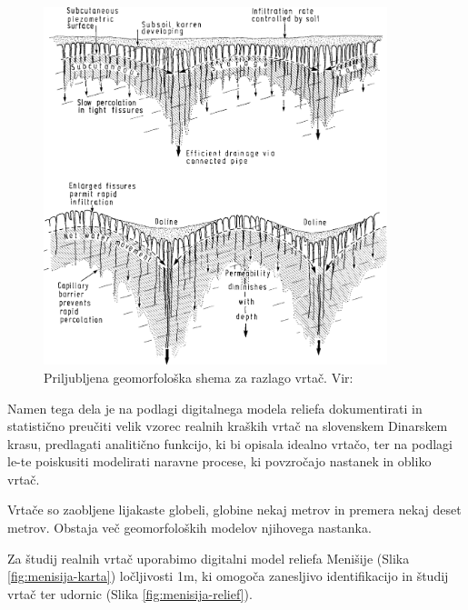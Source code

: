 \documentclass[a4paper, oneside, 12pt]{book}
\begin{document}
  \begin{figure}[H]
    \begin{center}
      \includegraphics[width=10cm]{slike/vrtaca-ford-williams}
    \end{center}
    \caption{Priljubljena geomorfološka shema za razlago vrtač. Vir: \cite{ford2007karst}}
    \label{fig:vrtaca-ford-williams}
  \end{figure}

  Namen tega dela je na podlagi digitalnega modela reliefa dokumentirati in statistično preučiti velik vzorec realnih kraških vrtač na slovenskem Dinarskem krasu, predlagati analitično funkcijo, ki bi opisala idealno vrtačo, ter na podlagi le-te poiskusiti modelirati naravne procese, ki povzročajo nastanek in obliko vrtač.

  Vrtače so zaobljene lijakaste globeli, globine nekaj metrov in premera nekaj deset metrov. Obstaja več geomorfoloških modelov njihovega nastanka.

  Za študij realnih vrtač uporabimo digitalni model reliefa Menišije (Slika \ref{fig:menisija-karta}) ločljivosti 1m, ki omogoča zanesljivo identifikacijo in študij vrtač ter udornic (Slika \ref{fig:menisija-relief}).
\end{document}

